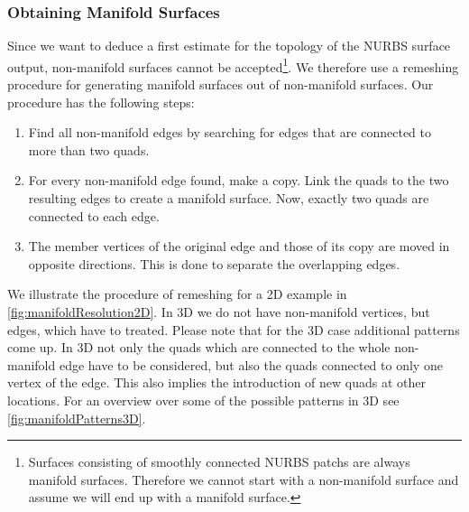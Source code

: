 \subsubsection{Obtaining Manifold Surfaces}
Since we want to deduce a first estimate for the topology of the \ac{NURBS} surface output, non-manifold surfaces cannot be accepted\footnote{Surfaces consisting of smoothly connected \ac{NURBS} \acp{patch} are always manifold surfaces. Therefore we cannot start with a non-manifold surface and assume we will end up with a manifold surface.}. We therefore use a remeshing procedure for generating manifold surfaces out of non-manifold surfaces. Our procedure has the following steps:
\begin{enumerate}
\item Find all non-manifold edges by searching for edges that are connected to more than two \acp{quad}.
\item For every non-manifold edge found, make a copy. Link the quads to the two resulting edges to create a manifold surface. Now, exactly two \acp{quad} are connected to each edge.
\item The member vertices of the original edge and those of its copy are moved in opposite directions. This is done to separate the overlapping edges. 
\end{enumerate}
We illustrate the procedure of remeshing for a 2D example in \autoref{fig:manifoldResolution2D}. 
In 3D we do not have non-manifold vertices, but edges, which have to treated. Please note that for the 3D case additional patterns come up. In 3D not only the \acp{quad} which are connected to the whole non-manifold edge have to be considered, but also the \acp{quad} connected to only one vertex of the edge. This also implies the introduction of new \acp{quad} at other locations. For an overview over some of the possible patterns in 3D see \autoref{fig:manifoldPatterns3D}.

